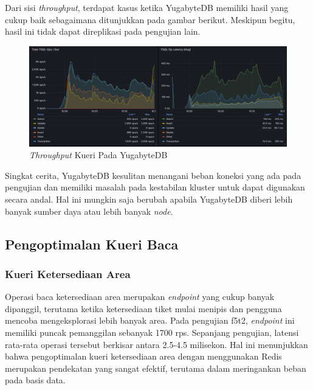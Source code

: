 Dari sisi \textit{throughput}, terdapat kasus ketika YugabyteDB memiliki hasil yang cukup baik sebagaimana ditunjukkan pada gambar berikut. Meskipun begitu, hasil ini tidak dapat direplikasi pada pengujian lain.

\begin{figure}[htbp]
    \centering
    \includegraphics[width=1\textwidth]{resources/chapter-4/yugabyte-ops.png}
    \caption{\textit{Throughput} Kueri Pada YugabyteDB}
    \label{fig:yugabytedb-throughput}
\end{figure}

Singkat cerita, YugabyteDB kesulitan menangani beban koneksi yang ada pada pengujian dan memiliki masalah pada kestabilan kluster untuk dapat digunakan secara andal. Hal ini mungkin saja berubah apabila YugabyteDB diberi lebih banyak sumber daya atau lebih banyak \textit{node}.

\subsection{Pengoptimalan Kueri Baca}

\subsubsection{Kueri Ketersediaan Area}

Operasi baca ketersediaan area merupakan \textit{endpoint} yang cukup banyak dipanggil, terutama ketika ketersediaan tiket mulai menipis dan pengguna mencoba mengeksplorasi lebih banyak area. Pada pengujian f5t2, \textit{endpoint} ini memiliki puncak pemanggilan sebanyak 1700 rps. Sepanjang pengujian, latensi rata-rata operasi tersebut berkisar antara 2.5-4.5 milisekon. Hal ini menunjukkan bahwa pengoptimalan kueri ketersediaan area dengan menggunakan Redis merupakan pendekatan yang sangat efektif, terutama dalam meringankan beban pada basis data.

\pagebreak


